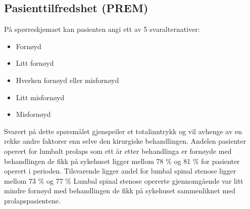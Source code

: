       

\subsection{Pasienttilfredshet (PREM)}

På spørreskjemaet kan pasienten angi ett av 5 svaralternativer:
      \begin{itemize}
\item Fornøyd
\item Litt fornøyd
\item Hverken fornøyd eller misfornøyd
\item Litt misfornøyd
\item Misfornøyd
\end{itemize} 

 
Svarert på dette spørsmålet gjenspeiler et totalinntrykk og vil avhenge av en rekke andre faktorer enn selve den kirurgiske behandlingen. Andelen pasienter operert for lumbalt prolaps som ett år etter behandlinga er fornøyde med behandlingen de fikk på sykehuset  
ligger mellom 78 \% og 81 \% 
      for pasienter operert i perioden. 
Tilsvarende ligger andel for lumbal spinal stenose ligger mellom 73 \% 
og 77 \%
Lumbal spinal stenose opererte gjennomgående var litt mindre fornøyd med behandlingen de fikk på sykehuset sammenliknet med prolapspasientene.





      

